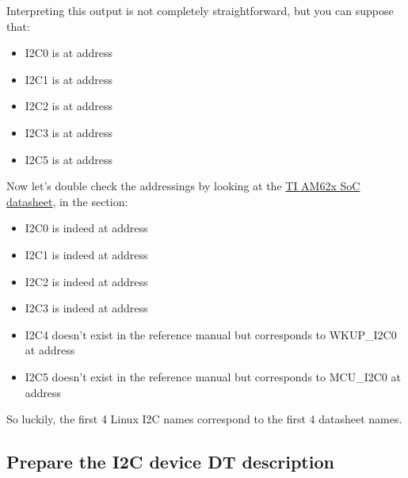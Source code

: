 Interpreting this output is not completely straightforward, but you can suppose
that:

\begin{itemize}
\item I2C0 is at address 
\item I2C1 is at address 
\item I2C2 is at address 
\item I2C3 is at address 
\item I2C5 is at address 
\end{itemize}

Now let's double check the addressings by looking at the
\href{https://www.ti.com/lit/ug/spruiv7a/spruiv7a.pdf}{TI AM62x SoC
datasheet}, in the  section:

\begin{itemize}
\item I2C0 is indeed at address 
\item I2C1 is indeed at address 
\item I2C2 is indeed at address 
\item I2C3 is indeed at address 
\item I2C4 doesn't exist in the reference manual but corresponds to
      WKUP\_I2C0 at address 
\item I2C5 doesn't exist in the reference manual but corresponds to
      MCU\_I2C0 at address 
\end{itemize}

So luckily, the first 4 Linux I2C names correspond to the first 4 datasheet
names.

\subsection{Prepare the I2C device DT description}

